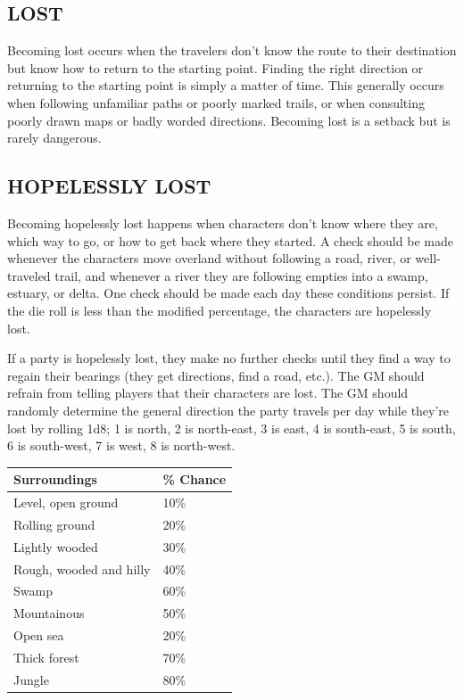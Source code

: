 \begin{multicols}{2}
\subsection{LOST}

Becoming lost occurs when the travelers don't know the route to their destination but know how to return to the starting point.  Finding the right direction or returning to the starting point is simply a matter of time.  This generally occurs when following unfamiliar paths or poorly marked trails, or when consulting poorly drawn maps or badly worded directions.  Becoming lost is a setback but is rarely dangerous.

\subsection{HOPELESSLY LOST}

Becoming hopelessly lost happens when characters don't know where they are, which way to go, or how to get back where they started.  A check should be made whenever the characters move overland without following a road, river, or well-traveled trail, and whenever a river they are following empties into a swamp, estuary, or delta.  One check should be made each day these conditions persist.  If the die roll is less than the modified percentage, the characters are hopelessly lost.

If a party is hopelessly lost, they make no further checks until they find a way to regain their bearings (they get directions, find a road, etc.).  The GM should refrain from telling players that their characters are lost.  The GM should randomly determine the general direction the party travels per day while they're lost by rolling 1d8; 1 is north, 2 is north-east, 3 is east, 4 is south-east, 5 is south, 6 is south-west, 7 is west, 8 is north-west.

\noindent
\begin{minipage}{\columnwidth}

\label{lostchance}
\noindent
\begin{tabular}{|p{}|p{}|}
\hline
Surroundings			& \% Chance \\
\hline\hline
\rowcolor[gray]{.9}Level, open ground		& 10\% \\
Rolling ground			& 20\% \\
\rowcolor[gray]{.9}Lightly wooded			& 30\% \\
Rough, wooded and hilly	& 40\% \\
\rowcolor[gray]{.9}Swamp					& 60\% \\
Mountainous				& 50\% \\
\rowcolor[gray]{.9}Open sea				& 20\% \\
Thick forest			& 70\% \\
\rowcolor[gray]{.9}Jungle					& 80\% \\
\hline
\end{tabular}


\end{minipage}
\end{multicols}
